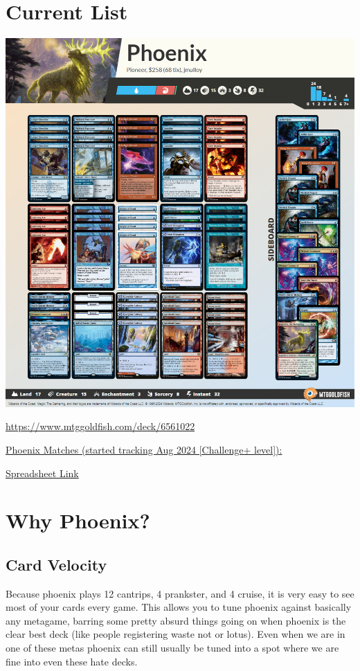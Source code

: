 \documentclass[12pt]{article}
\begin{document}
\section{Current List}
\begin{center}
    \href{https://www.mtggoldfish.com/deck/6561022#online}{\includegraphics[width=1\textwidth]{decklist}}

    \href{https://www.mtggoldfish.com/deck/6561022}{https://www.mtggoldfish.com/deck/6561022}

    \vspace{0.5cm}

    \href{https://docs.google.com/spreadsheets/d/1DheUoGrQmpuwzbMDpPVJHcCrfe7UOyXSMSSkL8aXnv0/edit?usp=sharing}{Phoenix Matches (started tracking Aug 2024 [Challenge+ level]):}

    \href{https://docs.google.com/spreadsheets/d/1DheUoGrQmpuwzbMDpPVJHcCrfe7UOyXSMSSkL8aXnv0/edit?usp=sharing}{Spreadsheet Link}
\end{center}

\clearpage
\section{Why Phoenix?}
\subsection{Card Velocity}
Because phoenix plays 12 cantrips, 4 prankster, and 4 cruise, it is very easy to see most of your cards every game. This allows you to tune phoenix against basically any metagame, barring some pretty absurd things going on when phoenix is the clear best deck (like people registering waste not or lotus). Even when we are in one of these metas phoenix can still usually be tuned into a spot where we are fine into even these hate decks.
\end{document}
